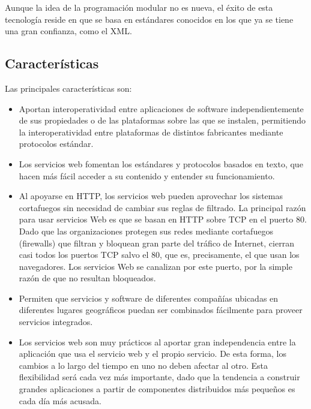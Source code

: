 Aunque la idea de la programación modular no es nueva, el éxito de esta tecnología reside en que se basa en estándares conocidos en los que ya se tiene una gran confianza, como el XML. 

\subsection{Características}
Las principales características son:
\begin{itemize}
	
	\item  Aportan interoperatividad entre aplicaciones de software independientemente de sus propiedades o de las plataformas sobre las que se instalen, permitiendo la interoperatividad entre plataformas de distintos fabricantes mediante protocolos estándar. 
	
	\item  Los servicios web fomentan los estándares y protocolos basados en texto, que hacen más fácil acceder a su contenido y entender su funcionamiento. 

	\item  Al apoyarse en HTTP, los servicios web pueden aprovechar los sistemas cortafuegos sin necesidad de cambiar sus reglas de filtrado. La principal razón para usar servicios Web es que se basan en HTTP sobre TCP en el puerto 80. Dado que las organizaciones protegen sus redes mediante cortafuegos (firewalls) que filtran y bloquean gran parte del tráfico de Internet, cierran casi todos los puertos TCP salvo el 80, que es, precisamente, el que usan los navegadores. Los servicios Web se canalizan por este puerto, por la simple razón de que no resultan bloqueados. 
	
	\item  Permiten que servicios y software de diferentes compañías ubicadas en diferentes lugares geográficos puedan ser combinados fácilmente para proveer servicios integrados. 

	\item  Los servicios web son muy prácticos al aportar gran independencia entre la aplicación que usa el servicio web y el propio servicio. De esta forma, los cambios a lo largo del tiempo en uno no deben afectar al otro. Esta flexibilidad será cada vez más importante, dado que la tendencia a construir grandes aplicaciones a partir de componentes distribuidos más pequeños es cada día más acusada. 

\end{itemize}

